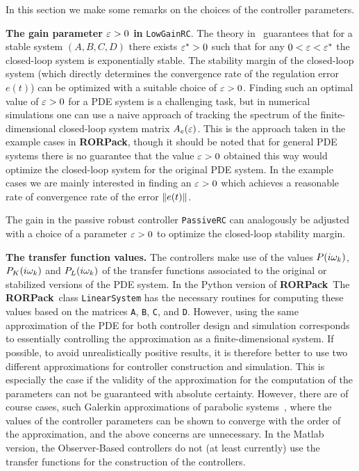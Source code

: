 \documentclass[11pt, a4paper]{amsart}
\theoremstyle{definition}
\numberwithin{equation}{section}
\newcommand{\RORname}{\textbf{RORPack}}
\begin{document}
In this section we make some remarks on the choices of the controller parameters.

\textbf{The gain parameter $\varepsilon>0$ in }\texttt{LowGainRC}. 
The theory in~\cite{HamPoh00,RebWei03} guarantees that for a stable system $(A,B,C,D)$ there exists $\varepsilon^\ast>0$ such that for any $0<\varepsilon<\varepsilon^\ast$ the closed-loop system is exponentially stable. The stability margin of the closed-loop system (which directly determines the convergence rate of the regulation error $e(t)$) can be optimized with a suitable choice of $\varepsilon>0$. Finding such an optimal value of $\varepsilon>0$ for a PDE system is a challenging task, but in numerical simulations one can use a naive approach of tracking the spectrum of the finite-dimensional closed-loop system matrix $A_e(\varepsilon)$. This is the approach taken in the example cases in \RORname, though it should be noted that for general PDE systems there is no guarantee that the value $\varepsilon>0$ obtained this way would optimize the closed-loop system for the original PDE system. 
In the example cases we are mainly interested in finding an $\varepsilon>0$ which achieves a reasonable rate of convergence rate of the error $\lVert e(t)\rVert$.

The gain in the passive robust controller \texttt{PassiveRC} can analogously be adjusted with a choice of a parameter $\varepsilon>0$ to optimize the closed-loop stability margin.

\textbf{The transfer function values.} The controllers make use of the values $P(i\omega_k)$, $P_K(i\omega_k)$ and $P_L(i\omega_k)$ of the transfer functions associated to the original or stabilized versions of the PDE system.
In the Python version of \RORname\ The \RORname\ class \texttt{LinearSystem} has the necessary routines for computing these values based on the matrices \texttt{A}, \texttt{B}, \texttt{C}, and \texttt{D}. However, using the same approximation of the PDE for both controller design and simulation corresponds to essentially controlling the approximation as a finite-dimensional system. If possible, to avoid unrealistically positive results, it is therefore better to use two different approximations for controller construction and simulation. This is especially the case if the validity of the approximation for the computation of the parameters can not be guaranteed with absolute certainty. However, there are of course cases, such Galerkin approximations of parabolic systems~\cite{Mor94}, where the values of the controller parameters can be shown to converge with the order of the approximation, and the above concerns are unnecessary.
In the Matlab version, the Observer-Based controllers do not (at least currently) use the transfer functions for the construction of the controllers.
\end{document}
